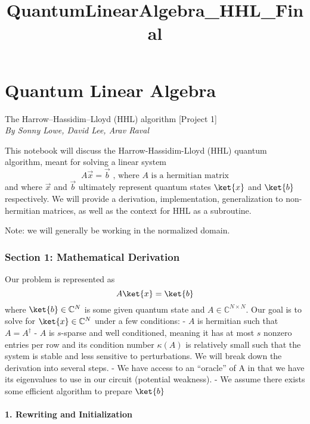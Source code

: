 \documentclass[11pt]{article}
\title{QuantumLinearAlgebra\_HHL\_Final}
\begin{document}
    
    \maketitle
    
    

    
    \section{Quantum Linear Algebra}\label{quantum-linear-algebra}

The Harrow--Hassidim--Lloyd (HHL) algorithm {[}Project 1{]}\\
\emph{By Sonny Lowe, David Lee, Arav Raval}

    This notebook will discuss the Harrow-Hassidim-Lloyd (HHL) quantum
algorithm, meant for solving a linear system
\[A\vec{x}=\vec{b} \text{ ,  where } A \text{ is a hermitian matrix}\]
and where \(\vec{x}\) and \(\vec{b}\) ultimately represent quantum
states \(\ket{x}\) and \(\ket{b}\) respectively. We will provide a
derivation, implementation, generalization to non-hermitian matrices, as
well as the context for HHL as a subroutine.

Note: we will generally be working in the normalized domain.

    \subsubsection{Section 1: Mathematical
Derivation}\label{section-1-mathematical-derivation}

Our problem is represented as \[A\ket{x} = \ket{b}\] where
\(\ket{b} \in \mathbb{C}^N\) is some given quantum state and
\(A \in \mathbb{C}^{N\times N}\). Our goal is to solve for
\(\ket{x} \in \mathbb{C}^N\) under a few conditions: - \(A\) is
hermitian such that \(A = A^\dagger\) - \(A\) is \(s\)-sparse and well
conditioned, meaning it has at most \(s\) nonzero entries per row and
its condition number \(\kappa(A)\) is relatively small such that the
system is stable and less sensitive to perturbations. We will break down
the derivation into several steps. - We have access to an ``oracle'' of
A in that we have its eigenvalues to use in our circuit (potential
weakness). - We assume there exists some efficient algorithm to prepare
\(\ket{b}\)

\paragraph{\texorpdfstring{\textbf{1. Rewriting and
Initialization}}{1. Rewriting and Initialization}}\label{rewriting-and-initialization}
\end{document}
